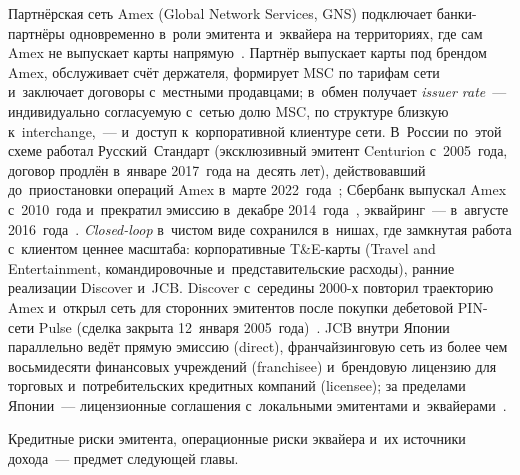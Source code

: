 Партнёрская сеть Amex (Global Network Services, GNS) подключает банки-партнёры
одновременно в~роли эмитента и~эквайера на территориях, где сам Amex не
выпускает карты напрямую~\cite{amex-10k-gns}. Партнёр выпускает карты под брендом
Amex, обслуживает счёт держателя, формирует MSC по тарифам сети и~заключает договоры
с~местными продавцами; в~обмен получает \textit{issuer rate}~--- индивидуально согласуемую
с~сетью долю MSC, по структуре близкую к~interchange,~--- и~доступ
к~корпоративной клиентуре сети. В~России по~этой схеме работал Русский~Стандарт
(эксклюзивный эмитент Centurion с~2005~года, договор продлён в~январе 2017~года
на~десять лет), действовавший до~приостановки операций Amex в~марте
2022~года~\cite{rsb-amex-2017}; Сбербанк выпускал Amex с~2010~года и~прекратил
эмиссию в~декабре 2014~года~\cite{vedomosti-amex-sberbank}, эквайринг~--- в~августе
2016~года~\cite{lenta-sberbank-amex-2016}. \textit{Closed-loop} в~чистом виде сохранился
в~нишах, где замкнутая работа с~клиентом ценнее масштаба: корпоративные
T\&E-карты (Travel and Entertainment, командировочные и~представительские
расходы), ранние реализации Discover и~JCB. Discover с~середины 2000-х повторил
траекторию Amex и~открыл сеть для сторонних эмитентов после покупки дебетовой
PIN-сети Pulse (сделка закрыта 12~января 2005~года)~\cite{discover-pulse-2005}.
JCB внутри Японии параллельно ведёт прямую эмиссию (direct), франчайзинговую
сеть из более чем восьмидесяти финансовых учреждений (franchisee) и~брендовую
лицензию для торговых и~потребительских кредитных компаний (licensee); за
пределами Японии~--- лицензионные соглашения с~локальными эмитентами
и~эквайерами~\cite{jcb-corp-profile}.

Кредитные риски эмитента, операционные риски эквайера и~их источники дохода~---
предмет следующей главы.
